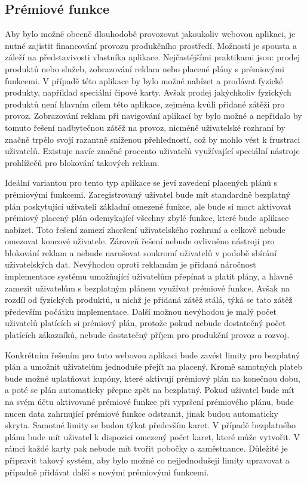 	\subsection{Prémiové funkce}

	Aby bylo možné obecně dlouhodobě provozovat jakoukoliv webovou aplikaci, je nutné zajistit financování provozu
	produkčního prostředí.
	Možností je spousta a záleží na představivosti vlastníka aplikace.
	Nejčastějšími praktikami jsou: prodej produktů nebo služeb, zobrazování reklam nebo placené plány s prémiovými funkcemi.
	V případě této aplikace by bylo možné nabízet a prodávat fyzické produkty, například speciální čipové karty.
	Avšak prodej jakýchkoliv fyzických produktů není hlavním cílem této aplikace, zejména kvůli přidané zátěži
	pro provoz.
	Zobrazování reklam při navigování aplikací by bylo možné a nepřidalo by tomuto řešení nadbytečnou zátěž na provoz,
	nicméně uživatelské rozhraní by značně trpělo svojí razantně sníženou přehledností, což by mohlo vést k frustraci uživatelů.
	Existuje navíc značné procento uživatelů využívající speciální nástroje prohlížečů pro blokování takových reklam.

	Ideální variantou pro tento typ aplikace se jeví zavedení placených plánů s prémiovými funkcemi.
	Zaregistrovaný uživatel bude mít standardně bezplatný plán poskytující uživateli základní omezené funkce, ale
	bude si moct aktivovat prémiový placený plán odemykající všechny zbylé funkce, které bude aplikace nabízet.
	Toto řešení zamezí zhoršení uživatelského rozhraní a celkově nebude omezovat koncové uživatele.
	Zároveň řešení nebude ovlivněno nástroji pro blokování reklam a nebude narušovat soukromí uživatelů v podobě
	sbírání uživatelských dat.
	Nevýhodou oproti reklamám je přidaná náročnost implementace systému umožňující uživatelům přepínat a platit
	plány, a hlavně zamezit uživatelům s bezplatným plánem využívat prémiové funkce.
	Avšak na rozdíl od fyzických produktů, u nichž je přidaná zátěž stálá, týká se tato zátěž především počátku implementace.
	Další možnou nevýhodou je malý počet uživatelů platících si prémiový plán, protože pokud nebude dostatečný počet
	platících zákazníků, nebude dostatečný příjem pro produkční provoz a rozvoj.

	Konkrétním řešením pro tuto webovou aplikaci bude zavést limity pro bezplatný plán a umožnit uživatelům jednoduše
	přejít na placený.
	Kromě samotných plateb bude možné uplatňovat kupóny, které aktivují prémiový plán na konečnou dobu, a poté se plán
	automaticky přepne zpět na bezplatný.
	Pokud uživatel bude mít na svém účtu aktivované prémiové funkce při vypršení prémiového plánu, bude nucen
	data zahrnující prémiové funkce odstranit, jinak budou automaticky skryta.
	Samotné limity se budou týkat především karet.
	V případě bezplatného plánu bude mít uživatel k dispozici omezený počet karet, které může vytvořit.
	V rámci každé karty pak nebude mít tvořit pobočky a zaměstnance.
	Důležité je připravit takový systém, aby bylo možné co nejjednodušeji limity upravovat a případně přidávat další
	s novými prémiovými funkcemi.

